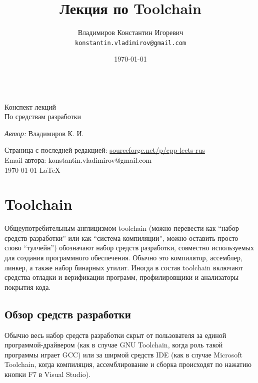 \documentclass[a4paper,12pt,oneside]{article}
\title{Лекция по Toolchain}
\author{
  Владимиров Константин Игоревич\\
  \texttt{konstantin.vladimirov@gmail.com}
}
\date{\today}
\renewcommand{\texttt}[2][black]{\textcolor{#1}{\ttfamily #2}}
\begin{document}
\begin{titlepage}
\begin{center}

\large ~ \\[4.5cm]

\huge Конспект лекций\\[0.6cm]
\large По средствам разработки\\[3.7cm]

\begin{minipage}{0.5\textwidth} %
\begin{flushleft} %
\emph{Автор:} Владимиров К. И.\\
\end{flushleft} %
\end{minipage} %

\vfill

Страница с последней редакцией: \url{sourceforge.net/p/cpp-lects-rus}\\
Email автора: \texttt{konstantin.vladimirov@gmail.com}\\
{\large \today}
{\large \LaTeX}

\end{center}
\thispagestyle{empty}
\end{titlepage}

\tableofcontents

\pagebreak
\section{Toolchain}\label{sec:Toolchain}

Общеупотребительным англицизмом toolchain (можно перевести как ``набор средств разработки'' или как ``система компиляции'', можно оставить просто слово ``тулчейн'') обозначают набор средств разработки, совместно используемых для создания программного обеспечения. Обычно это компилятор, ассемблер, линкер, а также набор бинарных утилит. Иногда в состав toolchain включают средства отладки и верификации программ, профилировщики и анализаторы покрытия кода.

\subsection{Обзор средств разработки}\label{subsec:Overview}

Обычно весь набор средств разработки скрыт от пользователя за единой программой-драйвером (как в случае GNU Toolchain, когда роль такой программы играет GCC) или за ширмой средств IDE (как в случае Microsoft Toolchain, когда компиляция, ассемблирование и сборка происходят по нажатию кнопки F7 в Visual Studio).
\end{document}
